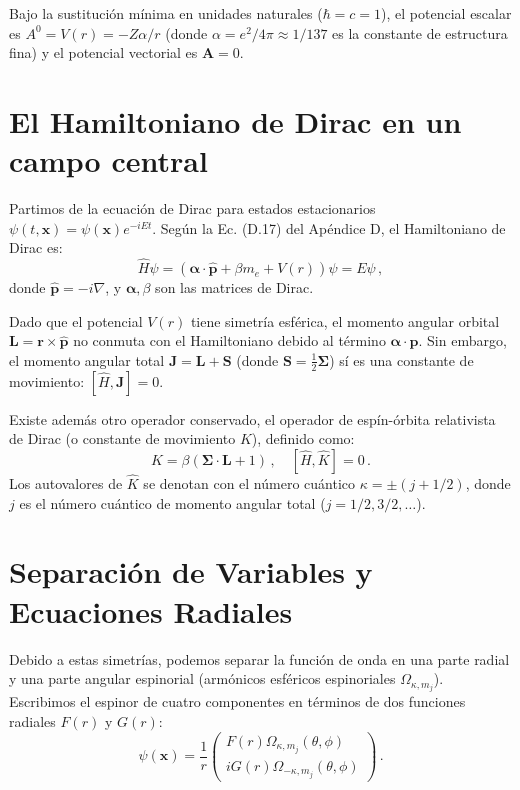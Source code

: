 Bajo la sustitución mínima en unidades naturales ($\hbar = c = 1$), el potencial escalar es $A^0 = V(r) = -Z\alpha/r$ (donde $\alpha = e^2/4\pi \approx 1/137$ es la constante de estructura fina) y el potencial vectorial es $\mathbf{A} = 0$. 

\section{El Hamiltoniano de Dirac en un campo central}

Partimos de la ecuación de Dirac para estados estacionarios $\psi(t, \mathbf{x}) = \psi(\mathbf{x})e^{-iEt}$. Según la Ec. (D.17) del Apéndice D, el Hamiltoniano de Dirac es:
\begin{equation}
    \hat{H} \psi = \left( \boldsymbol{\alpha} \cdot \mathbf{\hat{p}} + \beta m_e + V(r) \right) \psi = E \psi \, ,
    \label{eq:H_dirac_hidrogeno}
\end{equation}
donde $\mathbf{\hat{p}} = -i\nabla$, y $\boldsymbol{\alpha}, \beta$ son las matrices de Dirac.

Dado que el potencial $V(r)$ tiene simetría esférica, el momento angular orbital $\mathbf{L} = \mathbf{r} \times \mathbf{\hat{p}}$ no conmuta con el Hamiltoniano debido al término $\boldsymbol{\alpha} \cdot \mathbf{\hat{p}}$. Sin embargo, el momento angular total $\mathbf{J} = \mathbf{L} + \mathbf{S}$ (donde $\mathbf{S} = \frac{1}{2}\boldsymbol{\Sigma}$) sí es una constante de movimiento: $[\hat{H}, \mathbf{J}] = 0$.

Existe además otro operador conservado, el operador de espín-órbita relativista de Dirac (o constante de movimiento $K$), definido como:
\begin{equation}
    \hat{K} = \beta (\boldsymbol{\Sigma} \cdot \mathbf{L} + 1) \, , \quad [\hat{H}, \hat{K}] = 0 \, .
\end{equation}
Los autovalores de $\hat{K}$ se denotan con el número cuántico $\kappa = \pm(j + 1/2)$, donde $j$ es el número cuántico de momento angular total ($j = 1/2, 3/2, \dots$).

\section{Separación de Variables y Ecuaciones Radiales}

Debido a estas simetrías, podemos separar la función de onda en una parte radial y una parte angular espinorial (armónicos esféricos espinoriales $\Omega_{\kappa, m_j}$). Escribimos el espinor de cuatro componentes en términos de dos funciones radiales $F(r)$ y $G(r)$:
\begin{equation}
    \psi(\mathbf{x}) = \frac{1}{r} 
    \begin{pmatrix}
        F(r) \Omega_{\kappa, m_j}(\theta, \phi) \\
        i G(r) \Omega_{-\kappa, m_j}(\theta, \phi)
    \end{pmatrix} \, .
\end{equation}

